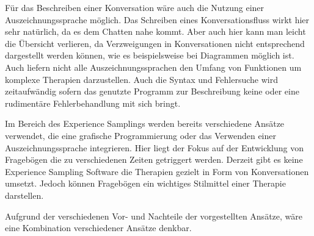 Für das Beschreiben einer Konversation wäre auch die Nutzung einer Auszeichnungssprache möglich. Das Schreiben eines Konversationsfluss wirkt hier sehr natürlich, da es dem Chatten nahe kommt. Aber auch hier kann man leicht die Übersicht verlieren, da Verzweigungen in Konversationen nicht entsprechend dargestellt werden können, wie es beispielsweise bei Diagrammen möglich ist. Auch liefern nicht alle Auszeichnungssprachen den Umfang von Funktionen um komplexe Therapien darzustellen. Auch die Syntax und Fehlersuche wird zeitaufwändig sofern das genutzte Programm zur Beschreibung keine oder eine rudimentäre Fehlerbehandlung mit sich bringt.  

Im Bereich des Experience Samplings werden bereits verschiedene Ansätze verwendet, die eine grafische Programmierung oder das Verwenden einer Auszeichnungssprache integrieren. Hier liegt der Fokus auf der Entwicklung von Fragebögen die zu verschiedenen Zeiten getriggert werden. Derzeit gibt es keine Experience Sampling Software die Therapien gezielt in Form von Konversationen umsetzt. Jedoch können Fragebögen ein wichtiges Stilmittel einer Therapie darstellen. 

Aufgrund der verschiedenen Vor- und Nachteile der vorgestellten Ansätze, wäre eine Kombination verschiedener Ansätze denkbar. 
